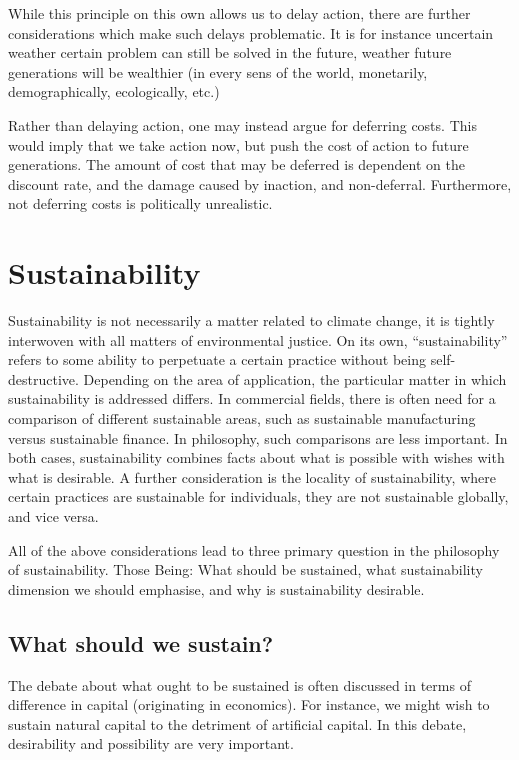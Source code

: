 \documentclass[12pt]{report}
\begin{document}
While this principle on this own allows us to delay action, there are further
considerations which make such delays problematic. It is for instance uncertain
weather certain problem can still be solved in the future, weather future
generations will be wealthier (in every sens of the world, monetarily,
demographically, ecologically, etc.)

Rather than delaying action, one may instead argue for deferring costs. This
would imply that we take action now, but push the cost of action to future
generations. The amount of cost that may be deferred is dependent on the
discount rate, and the damage caused by inaction, and non-deferral. Furthermore,
not deferring costs is politically unrealistic.

\chapter{Sustainability}

Sustainability is not necessarily a matter related to climate change, it is
tightly interwoven with all matters of environmental justice. On its own,
``sustainability'' refers to some ability to perpetuate a certain practice
without being self-destructive. Depending on the area of application, the
particular matter in which sustainability is addressed differs. In commercial
fields, there is often need for a comparison of different sustainable areas,
such as sustainable manufacturing versus sustainable finance. In philosophy,
such comparisons are less important. In both cases, sustainability combines
facts about what is possible with wishes with what is desirable. A further
consideration is the locality of sustainability, where certain practices are
sustainable for individuals, they are not sustainable globally, and vice versa.

All of the above considerations lead to three primary question in the philosophy
of sustainability. Those Being: What should be sustained, what sustainability
dimension we should emphasise, and why is sustainability desirable.

\section{What should we sustain?}

The debate about what ought to be sustained is often discussed in terms of
difference in capital (originating in economics). For instance, we might wish to
sustain natural capital to the detriment of artificial capital. In this debate,
desirability and possibility are very important.
\end{document}
